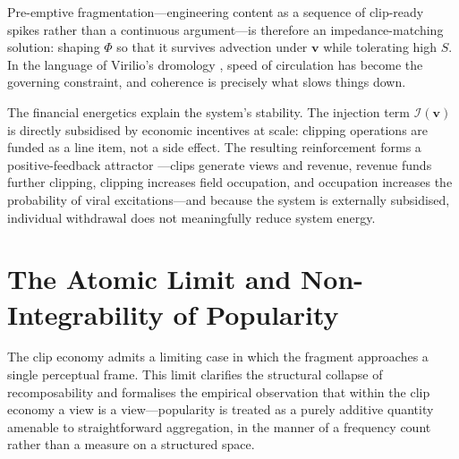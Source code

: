 \documentclass{amsart}
\theoremstyle{plain}
\theoremstyle{definition}
\theoremstyle{remark}
\newcommand{\scalar}{\Phi}
\newcommand{\vfield}{\mathbf{v}}
\newcommand{\entr}{S}
\newcommand{\Inj}{\mathcal{I}}
\begin{document}
Pre-emptive fragmentation---engineering content as a sequence of clip-ready spikes
rather than a continuous argument---is therefore an impedance-matching solution:
shaping $\scalar$ so that it survives advection under $\vfield$ while tolerating
high $\entr$.  In the language of Virilio's dromology \cite{virilio1986}, speed of
circulation has become the governing constraint, and coherence is precisely what
slows things down.

The financial energetics explain the system's stability.  The injection term
$\Inj(\vfield)$ is directly subsidised by economic incentives at scale: clipping
operations are funded as a line item, not a side effect.  The resulting
reinforcement forms a positive-feedback attractor \cite{strogatz2018}---clips
generate views and revenue, revenue funds further clipping, clipping increases
field occupation, and occupation increases the probability of viral
excitations---and because the system is externally subsidised, individual
withdrawal does not meaningfully reduce system energy.

\begin{center}
\end{center}

\section{The Atomic Limit and Non-Integrability of Popularity}
\label{sec:atomic}

The clip economy admits a limiting case in which the fragment approaches a single
perceptual frame.  This limit clarifies the structural collapse of recomposability
and formalises the empirical observation that within the clip economy a view is a
view---popularity is treated as a purely additive quantity amenable to
straightforward aggregation, in the manner of a frequency count rather than a
measure on a structured space.
\end{document}
